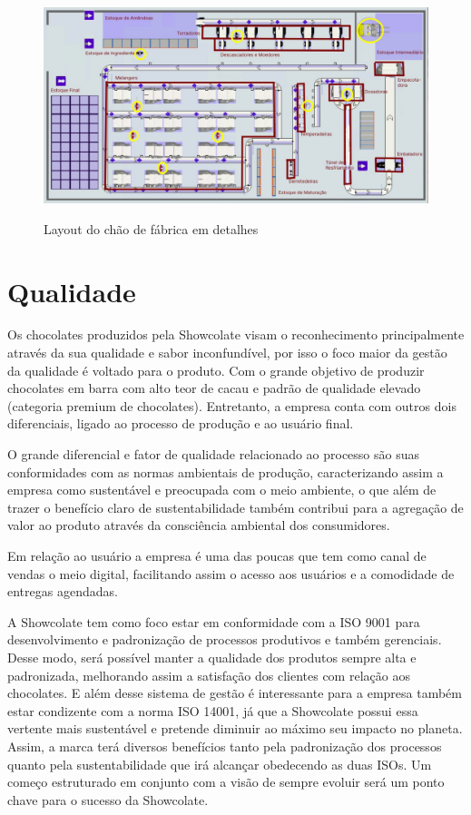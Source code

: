 \documentclass[
	12pt,				%
	openright,			%
	oneside,			%
	a4paper,			%
	english,			%
	french,				%
	spanish,			%
	brazil				%
	]{abntex2}
\begin{document}
\begin{figure}[H]
\begin{center}
\caption{Layout do chão de fábrica em detalhes}
\includegraphics[scale=0.3]{../../Pictures/WhatsApp Image 2022-09-17 at 14.55.23 (1).jpeg} 
\label{lay2}
\end{center}
\end{figure}

\chapter{Qualidade}

Os chocolates produzidos pela Showcolate visam o reconhecimento principalmente através da sua qualidade e sabor inconfundível, por isso o foco maior da gestão da qualidade é voltado para o produto. Com o grande objetivo de produzir chocolates em barra com alto teor de cacau e padrão de qualidade elevado (categoria premium de chocolates). Entretanto, a empresa conta com outros dois diferenciais, ligado ao processo de produção e ao usuário final.

O grande diferencial e fator de qualidade relacionado ao processo são suas conformidades com as normas ambientais de produção, caracterizando assim a empresa como sustentável e preocupada com o meio ambiente, o que além de trazer o benefício claro de sustentabilidade também contribui para a agregação de valor ao produto através da consciência ambiental dos consumidores.

Em relação ao usuário a empresa é uma das poucas que tem como canal de vendas o meio digital, facilitando assim o acesso aos usuários e a comodidade de entregas agendadas.

A Showcolate tem como foco estar em conformidade com a ISO 9001 para desenvolvimento e padronização de processos produtivos e também gerenciais. Desse modo, será possível manter a qualidade dos produtos sempre alta e padronizada, melhorando assim a satisfação dos clientes com relação aos chocolates. E além desse sistema de gestão é interessante para a empresa também estar condizente com a norma ISO 14001, já que a Showcolate possui essa vertente mais sustentável e pretende diminuir ao máximo seu impacto no planeta. Assim, a marca terá diversos benefícios tanto pela padronização dos processos quanto pela sustentabilidade que irá alcançar obedecendo as duas ISOs. Um começo estruturado em conjunto com a visão de sempre evoluir será um ponto chave para o sucesso da Showcolate.
\end{document}
